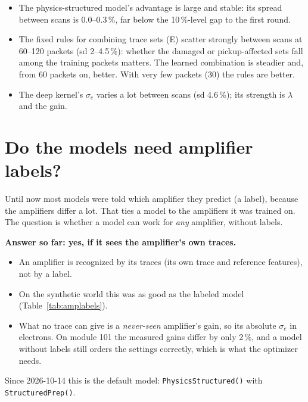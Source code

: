 \documentclass[10pt]{article}
\newcommand{\code}[1]{\texttt{#1}}
\begin{document}
\begin{itemize}
\item The physics-structured model's advantage is large and stable: its spread between scans is 0.0--0.3\,\%, far below the 10\,\%-level gap
  to the first round.
\item The fixed rules for combining trace sets (E) scatter strongly between scans at 60--120 packets (sd 2--4.5\,\%): whether the damaged
  or pickup-affected sets fall among the training packets matters. The learned combination is steadier and, from 60 packets on,
  better. With very few packets (30) the rules are better.
\item The deep kernel's $\sigma_e$ varies a lot between scans (sd 4.6\,\%); its strength is $\lambda$ and the gain.
\end{itemize}

\section{Do the models need amplifier labels?}
\label{sec:amplabels}

\begin{basic}
Until now most models were told which amplifier they predict (a label), because the amplifiers differ a lot. That ties a model to the
amplifiers it was trained on. The question is whether a model can work for \emph{any} amplifier, without labels.

\textbf{Answer so far: yes, if it sees the amplifier's own traces.}
\begin{itemize}
\item An amplifier is recognized by its traces (its own trace and reference features), not by a label.
\item On the synthetic world this was as good as the labeled model (Table~\ref{tab:amplabels}).
\item What no trace can give is a \emph{never-seen} amplifier's gain, so its absolute $\sigma_e$ in electrons. On module 101 the
  measured gains differ by only 2\,\%, and a model without labels still orders the settings correctly, which is what the optimizer needs.
\end{itemize}
Since 2026-10-14 this is the default model: \code{PhysicsStructured()} with \code{StructuredPrep()}.
\end{basic}
\end{document}

